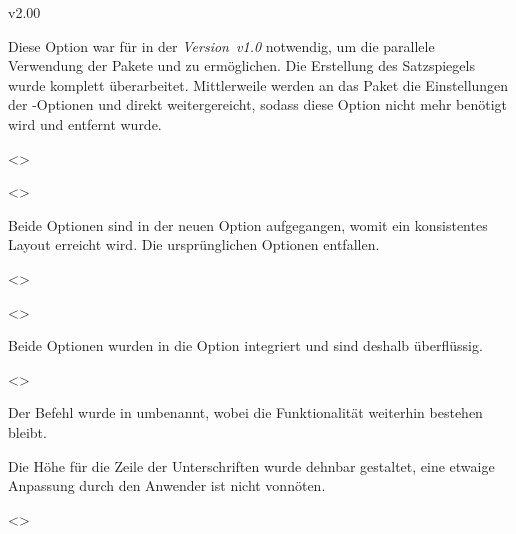 \begin{NoIndexDefault}
\begin{Cessations}{v2.00}
\begin{Cessation}
Diese Option war für \TUDScript in der \emph{Version~v1.0} notwendig, um die 
parallele Verwendung der Pakete  und  zu 
ermöglichen. Die Erstellung des Satzspiegels wurde komplett überarbeitet. 
Mittlerweile werden an das Paket  die Einstellungen der 
\KOMAScript-Optionen  und  direkt 
weitergereicht, sodass diese Option nicht mehr benötigt wird und entfernt wurde.
\end{Cessation}

\begin{Cessation}
  {}
  <>
\begin{Cessation}
  {}
  <>
\printdeclarationlist

Beide Optionen sind in der neuen Option  
aufgegangen, womit ein konsistentes Layout erreicht wird. Die ursprünglichen 
Optionen entfallen. 
\end{Cessation}
\end{Cessation}

\begin{Cessation}
  {}
  <>
\begin{Cessation}
  {}
  <>
\printdeclarationlist

Beide Optionen wurden in die Option  integriert und sind 
deshalb überflüssig.
\end{Cessation}
\end{Cessation}

\begin{Cessation}
  {}
  <>
\printdeclarationlist

Der Befehl wurde in  umbenannt, wobei die Funktionalität 
weiterhin bestehen bleibt.
\end{Cessation}

\begin{Cessation}
  {}
\printdeclarationlist

Die Höhe für die Zeile der Unterschriften wurde dehnbar gestaltet, eine etwaige 
Anpassung durch den Anwender ist nicht vonnöten.
\end{Cessation}

\begin{Cessation}
  {}
  <>
\printdeclarationlist


\end{Cessation}
\end{Cessations}
\end{NoIndexDefault}
